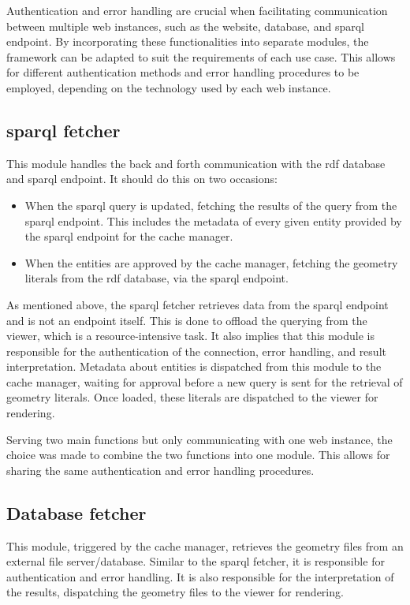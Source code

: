 Authentication and error handling are crucial when facilitating communication between multiple web instances, such as the website, database, and \ac{sparql} endpoint. By incorporating these functionalities into separate modules, the framework can be adapted to suit the requirements of each use case. This allows for different authentication methods and error handling procedures to be employed, depending on the technology used by each web instance.

\subsection{\acs{sparql} fetcher}

This module handles the back and forth communication with the \ac{rdf} database and \ac{sparql} endpoint. It should do this on two occasions:

\begin{itemize}
  \item When the \ac{sparql} query is updated, fetching the results of the query from the \ac{sparql} endpoint. This includes the metadata of every given entity provided by the \ac{sparql} endpoint for the cache manager.
  \item When the entities are approved by the cache manager, fetching the geometry literals from the \ac{rdf} database, via the \ac{sparql} endpoint.
\end{itemize}

As mentioned above, the \ac{sparql} fetcher retrieves data from the \ac{sparql} endpoint and is not an endpoint itself. This is done to offload the querying from the viewer, which is a resource-intensive task. It also implies that this module is responsible for the authentication of the connection, error handling, and result interpretation. Metadata about entities is dispatched from this module to the cache manager, waiting for approval before a new query is sent for the retrieval of geometry literals. Once loaded, these literals are dispatched to the viewer for rendering.

Serving two main functions but only communicating with one web instance, the choice was made to combine the two functions into one module. This allows for sharing the same authentication and error handling procedures.

\subsection{Database fetcher}
This module, triggered by the cache manager, retrieves the geometry files from an external file server/database. Similar to the \ac{sparql} fetcher, it is responsible for authentication and error handling. It is also responsible for the interpretation of the results, dispatching the geometry files to the viewer for rendering.

